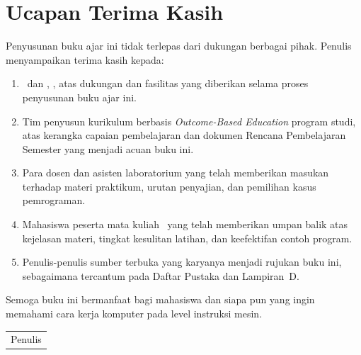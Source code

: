 
\chapter*{Ucapan Terima Kasih}

Penyusunan buku ajar ini tidak terlepas dari dukungan berbagai
pihak. Penulis menyampaikan terima kasih kepada:

\begin{enumerate}
    \item \BookProgram\ dan \BookFaculty, \BookInstitution, atas
          dukungan dan fasilitas yang diberikan selama proses
          penyusunan buku ajar ini.

    \item Tim penyusun kurikulum berbasis \textit{Outcome-Based
          Education} program studi, atas kerangka capaian
          pembelajaran dan dokumen Rencana Pembelajaran Semester
          yang menjadi acuan buku ini.

    \item Para dosen dan asisten laboratorium yang telah memberikan
          masukan terhadap materi praktikum, urutan penyajian, dan
          pemilihan kasus pemrograman.

    \item Mahasiswa peserta mata kuliah \BookCourse\ yang telah
          memberikan umpan balik atas kejelasan materi, tingkat
          kesulitan latihan, dan keefektifan contoh program.

    \item Penulis-penulis sumber terbuka yang karyanya menjadi
          rujukan buku ini, sebagaimana tercantum pada Daftar
          Pustaka dan Lampiran~D.
\end{enumerate}

Semoga buku ini bermanfaat bagi mahasiswa dan siapa pun yang ingin
memahami cara kerja komputer pada level instruksi mesin.

\vspace{1cm}

\begin{flushright}
\begin{tabular}{c}
Penulis
\end{tabular}
\end{flushright}

\clearpage
